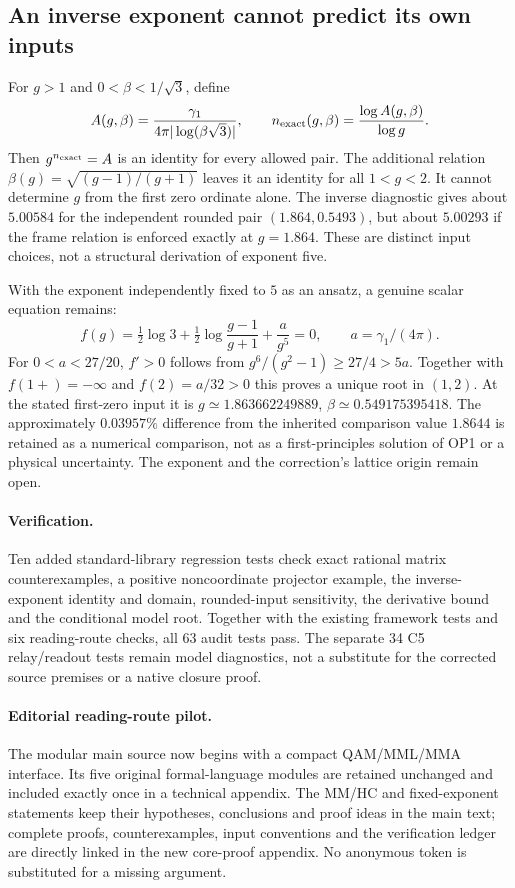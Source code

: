\documentclass[11pt,a4paper]{article}
\begin{document}
\subsection{An inverse exponent cannot predict its own inputs}

For $g>1$ and $0<\beta<1/\sqrt3$, define
\[
 A(g,\beta)=\frac{\gamma_1}{4\pi|\log(\beta\sqrt3)|},\qquad
 n_{\rm exact}(g,\beta)=\frac{\log A(g,\beta)}{\log g}.
\]
Then $g^{n_{\rm exact}}=A$ is an identity for every allowed pair.
The additional relation $\beta(g)=\sqrt{(g-1)/(g+1)}$ leaves it
an identity for all $1<g<2$. It cannot determine $g$ from the
first zero ordinate alone. The inverse diagnostic gives about
$5.00584$ for the independent rounded pair $(1.864,0.5493)$,
but about $5.00293$ if the frame relation is enforced exactly
at $g=1.864$. These are distinct input choices, not a structural
derivation of exponent five.

With the exponent independently fixed to $5$ as an ansatz, a genuine
scalar equation remains:
\[
 f(g)=\tfrac12\log3+\tfrac12\log\frac{g-1}{g+1}
              +\frac{a}{g^5}=0,\qquad a=\gamma_1/(4\pi).
\]
For $0<a<27/20$, $f'>0$ follows from
$g^6/(g^2-1)\geq27/4>5a$. Together with
$f(1+)=-\infty$ and $f(2)=a/32>0$ this proves a unique root
in $(1,2)$. At the stated first-zero input it is
$g\simeq1.863662249889$, $\beta\simeq0.549175395418$.
The approximately $0.03957\%$ difference from the inherited
comparison value $1.8644$ is retained as a numerical comparison,
not as a first-principles solution of OP1 or a physical uncertainty.
The exponent and the correction's lattice origin remain open.

\paragraph{Verification.}
Ten added standard-library regression tests check exact rational
matrix counterexamples, a positive noncoordinate projector example,
the inverse-exponent identity and domain, rounded-input sensitivity,
the derivative bound and the conditional model root. Together with
the existing framework tests and six reading-route checks, all 63
audit tests pass. The separate
34 C5 relay/readout tests remain model diagnostics, not a substitute
for the corrected source premises or a native closure proof.

\paragraph{Editorial reading-route pilot.}
The modular main source now begins with a compact QAM/MML/MMA
interface. Its five original formal-language modules are retained
unchanged and included exactly once in a technical appendix.
The MM/HC and fixed-exponent statements keep their hypotheses,
conclusions and proof ideas in the main text; complete proofs,
counterexamples, input conventions and the verification ledger
are directly linked in the new core-proof appendix. No anonymous
token is substituted for a missing argument.
\end{document}
